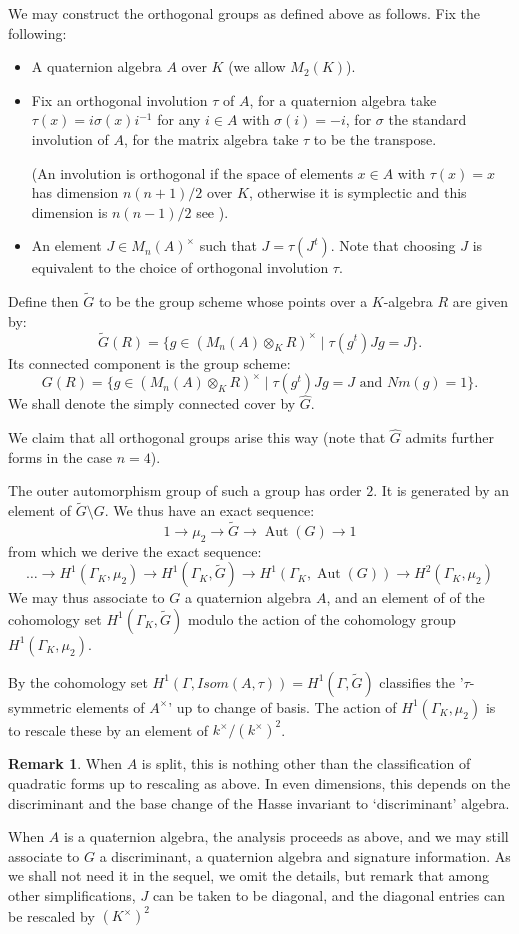 \documentclass{article}
\theoremstyle{plain}
\theoremstyle{definition}
\newtheorem{remark}[theorem]{Remark}
\DeclareMathOperator{\Aut}{Aut}
\newcommand{\GalKbK}{\Gamma_K}
\begin{document}
We may construct the orthogonal groups as defined above as follows. Fix the following:
\begin{itemize}
\item A quaternion algebra $A$ over $K$ (we allow $M_2(K)$).
\item Fix an orthogonal involution $\tau$ of $A$, for a quaternion algebra take $\tau(x) = i\sigma(x)i^{-1}$ for any $i\in A$ with $\sigma(i) = -i$, for $\sigma$ the standard involution of $A$, for the matrix algebra take $\tau$ to be the transpose.

(An involution is orthogonal if the space of elements $x\in A$ with $\tau(x) = x$ has dimension $n(n+1)/2$ over $K$, otherwise it is symplectic and this dimension is $n(n-1)/2$ see \cite[2.6]{TODO the book of involutions}).
\item An element $J \in M_{n}(A)^\times$ such that $J = \tau(J^t)$.
Note that choosing $J$ is equivalent to the choice of orthogonal involution $\tau$.
\end{itemize}
Define then $\tilde{G}$ to be the group scheme whose points over a $K$-algebra $R$ are given by:
\[ \tilde{G}(R) = \{ g\in (M_{n}(A) \otimes_K R)^\times \mid \tau(g^t)Jg = J  \}. \]
Its connected component is the group scheme:
\[ G(R) = \{ g\in (M_{n}(A) \otimes_K R)^\times \mid \tau(g^t)Jg = J  \text{ and } Nm(g) = 1 \}. \]
We shall denote the simply connected cover by $\hat{G}$.

We claim that all orthogonal groups arise this way (note that $\hat{G}$ admits further forms in the case $n=4$).

The outer automorphism group of such a group has order $2$.
It is generated by an element of $\tilde{G}\setminus G$.
We thus have an exact sequence:
\[ 1 \rightarrow \mu_2 \rightarrow \tilde{G} \rightarrow \Aut(G) \rightarrow 1 \]
from which we derive the exact sequence:
\[\ldots \rightarrow H^1(\GalKbK,\mu_2) \rightarrow  H^1(\GalKbK, \tilde{G})  \rightarrow  H^1(\GalKbK, \Aut(G)) \rightarrow  H^2(\GalKbK, \mu_2)  \]
We may thus associate to $G$ a quaternion algebra $A$, and an element of of the cohomology set $H^1(\GalKbK, \tilde{G})$ modulo the action of the cohomology group $H^1(\GalKbK,\mu_2)$.

By \cite[29.16]{TODO - The book of involutions}
the cohomology set $H^1(\Gamma, Isom(A,\tau)) = H^1(\Gamma,\tilde{G}) $ classifies the '$\tau$-symmetric elements of $A^\times$' up to change of basis.
The action of $H^1(\GalKbK,\mu_2) $ is to rescale these by an element of $k^\times/(k^\times)^2$.
\begin{remark}
When $A$ is split, this is nothing other than the classification of quadratic forms up to rescaling as above.
In even dimensions, this depends on the discriminant and the base change of the Hasse invariant to `discriminant' algebra.

When $A$ is a quaternion algebra, the analysis proceeds as above, and we may still associate to $G$ a discriminant, a quaternion algebra and signature information. 
As we shall not need it in the sequel, we omit the details, but remark that among other simplifications, $J$ can be taken to be diagonal, and the diagonal entries can be rescaled by $(K^\times)^2$
\end{remark}
\end{document}
